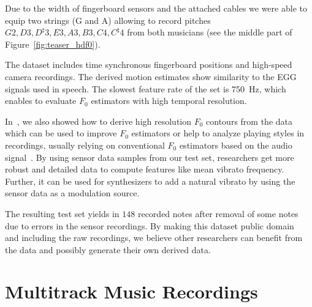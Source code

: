 Due to the width of fingerboard sensors and the attached cables we were able to equip two strings (G and A) allowing to record pitches ${G2, D3, D^\sharp3, E3, A3, B3, C4, C^\sharp4}$ from both musicians (see the middle part of Figure~\ref{fig:teaser_hdf0}).
\par
The dataset includes time synchronous fingerboard positions and high-speed camera recordings. 
The derived motion estimates show similarity to the EGG signals used in speech. 
The slowest feature rate of the set is \SI{750}{\hertz}, which enables to evaluate $F_0$ estimators with high temporal resolution. 
\par
In~\cite{stoeter15acm}, we also showed how to derive high resolution $F_0$ contours from the data which can be used to improve $F_0$ estimators or help to analyze playing styles in recordings, usually relying on conventional $F_0$ estimators based on the audio signal~\cite{mellody2000time}. 
By using sensor data samples from our test set, researchers get more robust and detailed data to compute features like mean vibrato frequency. 
Further, it can be used for synthesizers to add a natural vibrato by using the sensor data as a modulation source.
\par
The resulting test set yields in $148$ recorded notes after removal of some notes due to errors in the sensor recordings.
By making this dataset public domain~\cite{oss_muserc} and including the raw recordings, we believe other researchers can benefit from the data and possibly generate their own derived data.

\section{Multitrack Music Recordings}%
\label{sec:multitrack}

